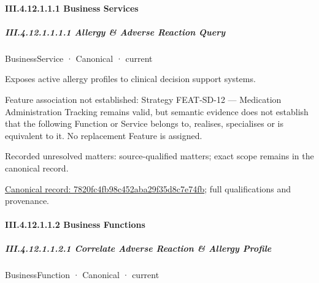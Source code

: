 \paragraph*{III.4.12.1.1.1 Business Services}
\label{navigation:III.4.12.1.1.1}

\subparagraph*{III.4.12.1.1.1.1 Allergy \& Adverse Reaction Query}
\label{navigation:III.4.12.1.1.1.1}

\label{element:7820fc4fb98c452aba29f35d8c7e74fb}
{\small BusinessService · Canonical · current}\par

Exposes active allergy profiles to clinical decision support systems.



Feature association not established: Strategy FEAT-SD-12 — Medication Administration Tracking remains valid, but semantic evidence does not establish that the following Function or Service belongs to, realises, specialises or is equivalent to it. No replacement Feature is assigned.


{\small Recorded unresolved matters: source-qualified matters; exact scope remains in the canonical record.}\par
{\footnotesize \href{../../../../continuum/business/business-service/7820fc4fb98c452aba29f35d8c7e74fb.md}{Canonical record: 7820fc4fb98c452aba29f35d8c7e74fb}; full qualifications and provenance.}\par
\paragraph*{III.4.12.1.1.2 Business Functions}
\label{navigation:III.4.12.1.1.2}

\subparagraph*{III.4.12.1.1.2.1 Correlate Adverse Reaction \& Allergy Profile}
\label{navigation:III.4.12.1.1.2.1}

\label{element:834d18fe21f14af7ad0c9773d2aaad1e}
{\small BusinessFunction · Canonical · current}\par

